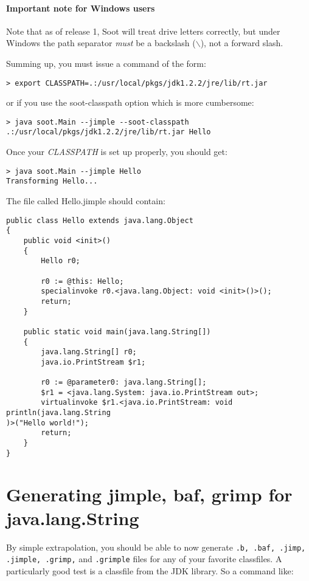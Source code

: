 \documentclass{article}
\begin{document}
\paragraph{Important note for Windows users} Note that as of release 1,
Soot will treat drive letters correctly, but under Windows the path
separator {\em must} be a backslash ($\backslash$), not a forward slash.

Summing up, you must issue a command of the form:

\begin{verbatim}
> export CLASSPATH=.:/usr/local/pkgs/jdk1.2.2/jre/lib/rt.jar
\end{verbatim}

or if you use the soot-classpath option which is more cumbersome:

\begin{verbatim}
> java soot.Main --jimple --soot-classpath .:/usr/local/pkgs/jdk1.2.2/jre/lib/rt.jar Hello
\end{verbatim}


Once your {\em CLASSPATH} is set up properly, you should get:

\begin{verbatim}
> java soot.Main --jimple Hello
Transforming Hello...
\end{verbatim}

The file called Hello.jimple should contain:

\begin{verbatim}
public class Hello extends java.lang.Object
{
    public void <init>()
    {
        Hello r0;

        r0 := @this: Hello;
        specialinvoke r0.<java.lang.Object: void <init>()>();
        return;
    }

    public static void main(java.lang.String[])
    {
        java.lang.String[] r0;
        java.io.PrintStream $r1;

        r0 := @parameter0: java.lang.String[];
        $r1 = <java.lang.System: java.io.PrintStream out>;
        virtualinvoke $r1.<java.io.PrintStream: void println(java.lang.String
)>("Hello world!");
        return;
    }
}
\end{verbatim}

\section{Generating jimple, baf, grimp for java.lang.String}

By simple extrapolation, you should be able to now generate {\tt .b, .baf,
.jimp, .jimple, .grimp,} and {\tt .grimple} files for any of your favorite
classfiles.  A particularly good test is a classfile from the JDK
library.  So a command like:
\end{document}

